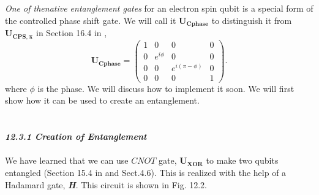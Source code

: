 \documentclass{article}
\newcommand{\bfit}[1]{\textit{\textbf{#1}}}
\begin{document}
\textit{One of thenative entanglement gates} for an electron spin qubit is a special form of the controlled
phase shift gate. We will call it $\boldsymbol{U_{Cphase}}$ \cite{meunier2011efficient} to distinguish it from 
$\boldsymbol{U_{C P S, \pi}}$ in Section 16.4 in \cite{WongHuiYong},
\begin{equation}\label{eq 12.1}
  \boldsymbol{U_{Cphase}}=\begin{pmatrix}
    1&0&0&0\\0&e^{i\phi}&0&0\\0&0&e^{i(\pi-\phi)}&0\\0&0&0&1
  \end{pmatrix}.\tag{12.1}
\end{equation}
where $\phi$ is the phase. We will discuss how to implement it soon. We will first show how it can be used to create an entanglement.
\\\\\\
\bfit{\large 12.3.1 Creation of Entanglement}
\\\\
We have learned that we can use $C N O T$ gate, $\boldsymbol{U_{XOR}}$ to make two qubits entangled (Section 15.4 in \cite{WongHuiYong} and Sect.4.6). This is
realized with the help of a Hadamard gate, \bfit{H}. This circuit is shown in Fig. 12.2.
\end{document}
